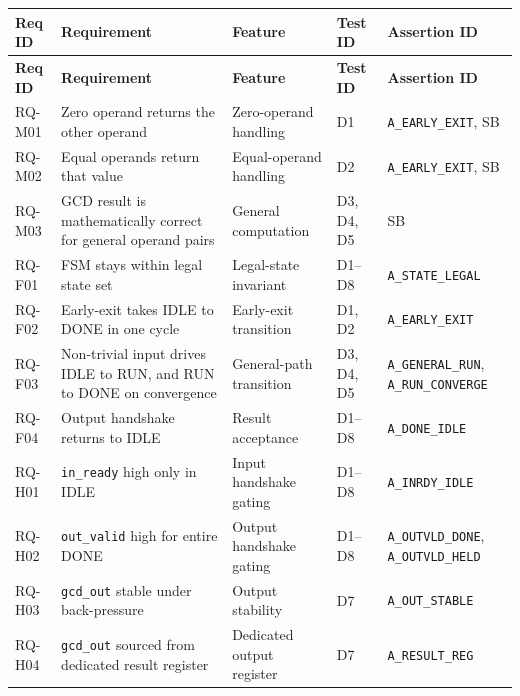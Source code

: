 \documentclass[11pt,a4paper]{article}
\begin{document}
{\small
\begin{longtable}{@{}p{1.3cm} p{5.0cm} p{2.8cm} p{1.4cm} p{3.2cm}@{}}
\toprule
\textbf{Req ID} & \textbf{Requirement} & \textbf{Feature} & \textbf{Test ID} & \textbf{Assertion ID} \\
\midrule
\endfirsthead

\toprule
\textbf{Req ID} & \textbf{Requirement} & \textbf{Feature} & \textbf{Test ID} & \textbf{Assertion ID} \\
\midrule
\endhead

\bottomrule
\endfoot

RQ-M01 & Zero operand returns the other operand & Zero-operand handling & D1 & \texttt{A\_EARLY\_EXIT}, SB \\

RQ-M02 & Equal operands return that value & Equal-operand handling & D2 & \texttt{A\_EARLY\_EXIT}, SB \\

RQ-M03 & GCD result is mathematically correct for general operand pairs & General computation & D3, D4, D5 & SB \\

RQ-F01 & FSM stays within legal state set & Legal-state invariant & D1--D8 & \texttt{A\_STATE\_LEGAL} \\

RQ-F02 & Early-exit takes IDLE to DONE in one cycle & Early-exit transition & D1, D2 & \texttt{A\_EARLY\_EXIT} \\

RQ-F03 & Non-trivial input drives IDLE to RUN, and RUN to DONE on convergence & General-path transition & D3, D4, D5 & \texttt{A\_GENERAL\_RUN}, \texttt{A\_RUN\_CONVERGE} \\

RQ-F04 & Output handshake returns to IDLE & Result acceptance & D1--D8 & \texttt{A\_DONE\_IDLE} \\

RQ-H01 & \texttt{in\_ready} high only in IDLE & Input handshake gating & D1--D8 & \texttt{A\_INRDY\_IDLE} \\

RQ-H02 & \texttt{out\_valid} high for entire DONE & Output handshake gating & D1--D8 & \texttt{A\_OUTVLD\_DONE}, \texttt{A\_OUTVLD\_HELD} \\

RQ-H03 & \texttt{gcd\_out} stable under back-pressure & Output stability & D7 & \texttt{A\_OUT\_STABLE} \\

RQ-H04 & \texttt{gcd\_out} sourced from dedicated result register & Dedicated output register & D7 & \texttt{A\_RESULT\_REG} \\


\end{longtable}}
\end{document}

